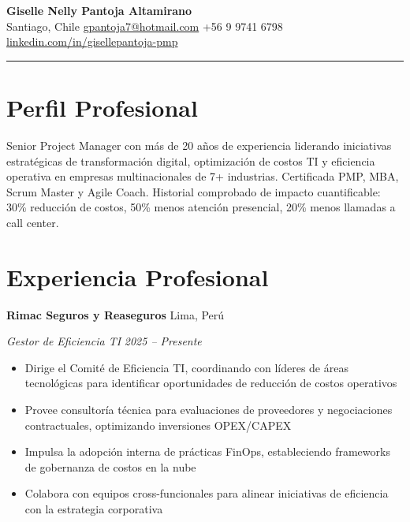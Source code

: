 \documentclass[11pt,letterpaper]{article}
\newcommand{\entry}[4]{%
  \noindent\textbf{#1} \hfill #2 \par\nopagebreak
  \textit{#3} \hfill \textit{#4} \par\nopagebreak
}
\begin{document}
\begin{center}
  {\LARGE\bfseries Giselle Nelly Pantoja Altamirano} \\[4pt]
  \enspace Santiago, Chile
  \quad{}\enspace \href{mailto:gpantoja7@hotmail.com}{gpantoja7@hotmail.com}
  \quad{}\enspace +56 9 9741 6798
  \\[2pt]
  \enspace \href{https://www.linkedin.com/in/gisellepantoja-pmp/}{linkedin.com/in/gisellepantoja-pmp}
\end{center}

\vspace{-0.4em}
\noindent\rule{\textwidth}{0.8pt}
\vspace{-0.8em}

\section{Perfil Profesional}

Senior Project Manager con m\'{a}s de 20 a\~{n}os de experiencia liderando iniciativas estrat\'{e}gicas de transformaci\'{o}n digital, optimizaci\'{o}n de costos TI y eficiencia operativa en empresas multinacionales de 7+ industrias. Certificada PMP, MBA, Scrum Master y Agile Coach. Historial comprobado de impacto cuantificable: 30\% reducci\'{o}n de costos, 50\% menos atenci\'{o}n presencial, 20\% menos llamadas a call center.

\section{Experiencia Profesional}

\entry{Rimac Seguros y Reaseguros}{Lima, Per\'{u}}{Gestor de Eficiencia TI}{2025 -- Presente}
\begin{itemize}
  \item Dirige el Comit\'{e} de Eficiencia TI, coordinando con l\'{i}deres de \'{a}reas tecnol\'{o}gicas para identificar oportunidades de reducci\'{o}n de costos operativos
  \item Provee consultor\'{i}a t\'{e}cnica para evaluaciones de proveedores y negociaciones contractuales, optimizando inversiones OPEX/CAPEX
  \item Impulsa la adopci\'{o}n interna de pr\'{a}cticas FinOps, estableciendo frameworks de gobernanza de costos en la nube
  \item Colabora con equipos cross-funcionales para alinear iniciativas de eficiencia con la estrategia corporativa
\end{itemize}
\vspace{0.3em}
\end{document}
